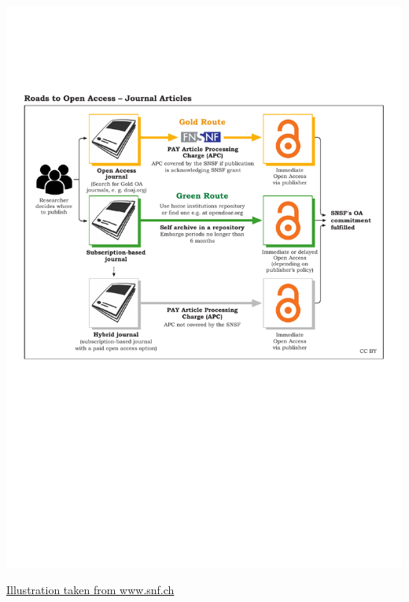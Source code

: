 \documentclass[10pt,compress,serif,aspectratio=169]{beamer}
\begin{document}
\begin{frame}[t]%
 \vskip1cm%

 \begin{center}
\includegraphics[width=.65\textwidth]{SNSF_Roads_to_OA_Articles}
\end{center}
\href{https://www.snf.ch/en/VyUvGzptStOEpUoC/topic/open-access-to-publications}{Illustration taken from www.snf.ch}

\end{frame}

\end{document}
